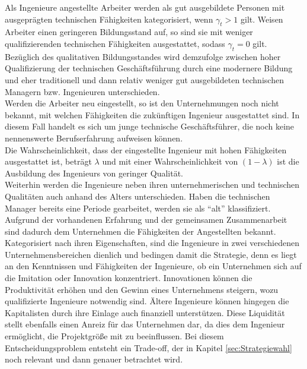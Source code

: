 %
Als Ingenieure angestellte Arbeiter werden als gut ausgebildete Personen mit ausgeprägten technischen Fähigkeiten kategorisiert, wenn $\gamma_t >1$ gilt. Weisen Arbeiter einen geringeren Bildungsstand auf, so sind sie mit weniger qualifizierenden technischen Fähigkeiten ausgestattet, sodass  $\gamma_t=0$ gilt. Bezüglich des qualitativen Bildungsstandes wird demzufolge zwischen hoher Qualifizierung der technischen Geschäftsführung durch eine modernere Bildung und eher traditionell und dann relativ weniger gut ausgebildeten technischen Managern bzw. Ingenieuren unterschieden.\\
Werden die Arbeiter neu eingestellt, so ist den Unternehmungen noch nicht bekannt, mit welchen Fähigkeiten die zukünftigen Ingenieur  ausgestattet sind. In diesem Fall handelt es sich um junge technische Geschäftsführer, die noch keine nennenswerte Berufserfahrung aufweisen können.\\ 
%
Die Wahrscheinlichkeit, dass der eingestellte Ingenieur mit hohen Fähigkeiten ausgestattet ist, beträgt $\lambda$ und mit einer Wahrscheinlichkeit von $(1-\lambda)$ ist die Ausbildung des Ingenieurs von geringer Qualität.\\
%
Weiterhin werden die Ingenieure neben ihren unternehmerischen und technischen Qualitäten auch anhand des Alters unterschieden. Haben die technischen Manager bereits eine Periode gearbeitet, werden sie als "`alt"' klassifiziert. Aufgrund der vorhandenen Erfahrung und der gemeinsamen Zusammenarbeit sind dadurch dem Unternehmen die Fähigkeiten der Angestellten bekannt.\\
%
Kategorisiert nach ihren Eigenschaften, sind die Ingenieure in zwei verschiedenen Unternehmensbereichen dienlich und bedingen damit die Strategie, denn es liegt an den Kenntnissen und Fähigkeiten der Ingenieure, ob ein Unternehmen sich auf die Imitation oder Innovation konzentriert. Innovationen können die Produktivität erhöhen und den Gewinn eines Unternehmens steigern, wozu qualifizierte Ingenieure notwendig sind. Ältere Ingenieure können hingegen die Kapitalisten durch ihre Einlage auch finanziell unterstützen. Diese Liquidität stellt ebenfalls einen Anreiz für das Unternehmen dar, da dies dem Ingenieur ermöglicht, die Projektgröße mit zu beeinflussen. Bei diesem Entscheidungsproblem entsteht ein Trade-off, der in Kapitel \ref{sec:Strategiewahl} noch relevant und dann genauer betrachtet wird.
%
